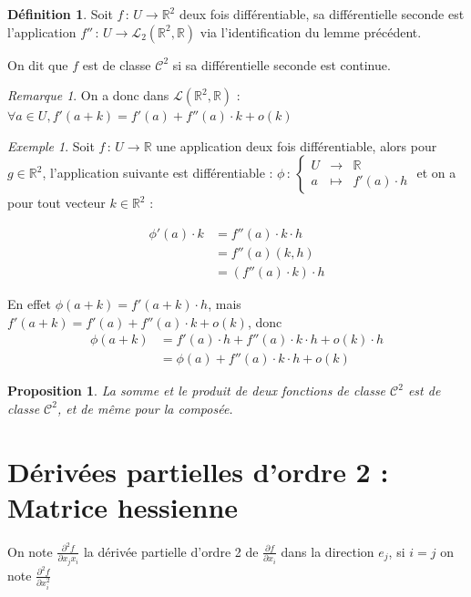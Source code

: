 \documentclass[]{article}
\newtheorem{myproposition}{Proposition}
\theoremstyle{remark}
\newtheorem{myrem}{Remarque}
\newtheorem{myexmpl}{Exemple}
\theoremstyle{definition}
\newtheorem{mydef}{Définition}
\newcommand{\func}[5]{
#1 \, : \, \left\{ \begin{array}{lcl}
	#2 & \longrightarrow & #3 \\
	#4 & \longmapsto & #5
\end{array}
\right.
}
\newcommand{\funcshort}[3]{
#1 \, : \, #2 \longrightarrow #3
}
\begin{document}
\begin{mydef}
	Soit $\funcshort{f}{U}{\mathbb{R}^2}$ deux fois différentiable, sa différentielle seconde est l'application $\funcshort{f''}{U}{\mathcal{L}_2(\mathbb{R}^2, \mathbb{R})}$ via l'identification du lemme précédent.
	
	On dit que $f$ est de classe $\mathcal{C}^2$ si sa différentielle seconde est continue.
\end{mydef}

\begin{myrem}
	On a donc dans $\mathcal{L}(\mathbb{R}^2, \mathbb{R})$ : $\forall a \in U, f'(a+k) = f'(a) + f''(a) \cdot k + o(k)$
\end{myrem}

\begin{myexmpl}
	Soit $\funcshort{f}{U}{\mathbb{R}}$ une application deux fois différentiable, alors pour $g \in \mathbb{R}^2$, l'application suivante est différentiable :
	$\func{\phi}{U}{\mathbb{R}}{a}{f'(a) \cdot h}$
	et on a pour tout vecteur $k \in \mathbb{R}^2$ :
	
	$$
	\begin{aligned}
		\phi'(a) \cdot k &= f''(a) \cdot k \cdot h\\
		&= f''(a)(k, h)\\
		&=(f''(a)\cdot k) \cdot h
	\end{aligned}
	$$
	
	En effet $\phi(a+k) = f'(a+k) \cdot h$, mais $f'(a+k) = f'(a) + f''(a) \cdot k + o(k)$, donc
	$$\begin{aligned}
		\phi(a+k) &= f'(a) \cdot h + f''(a) \cdot k \cdot h + o(k) \cdot h \\
		&=\phi(a) + f''(a) \cdot k \cdot h + o(k)
	\end{aligned}$$
\end{myexmpl}

\begin{myproposition}
	La somme et le produit de deux fonctions de classe $\mathcal{C}^2$ est de classe $\mathcal{C}^2$, et de même pour la composée.
\end{myproposition}

\section{Dérivées partielles d'ordre 2 : Matrice hessienne}

On note $\displaystyle \frac{\partial^2 f}{\partial x_j x_i}$ la dérivée partielle d'ordre 2 de $\displaystyle \frac{\partial f}{\partial x_i}$ dans la direction $e_j$, si $i = j$ on note $\displaystyle \frac{\partial^2 f}{\partial x_i^2}$
\end{document}
